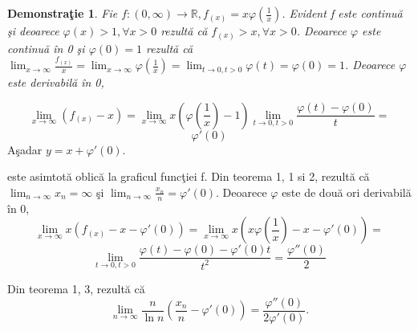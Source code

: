 \documentclass[a4paper,12pt,oneside]{report}
\newtheorem{demonstration}{Demonstra\c tie}
\begin{document}
\begin{demonstration}
  Fie \(f : \left ( 0,\infty  \right ) \to \mathbb{R}, f_{\left ( x \right )}= x\varphi \left ( \frac{1}{x} \right )\). Evident f este continu\u a \c si deoarece \(\varphi \left ( x \right )> 1,\forall x> 0\) rezult\u a c\u a \(f_{\left ( x \right )}> x, \forall x> 0\). Deoarece \(\varphi\) este continu\u a \^ in 0 \c si \(\varphi \left ( 0 \right )= 1\) rezult\u a c\u a \(\lim_{x \to \infty }\frac{f_{\left ( x \right )}}{x} = \lim_{x \to \infty } \varphi \left ( \frac{1}{x} \right ) = \lim_{t \to 0, t> 0 }\varphi \left ( t \right ) = \varphi \left ( 0 \right ) = 1\). Deoarece \(\varphi\) este derivabil\u a \^ in 0, 
\end{demonstration}

\begin{displaymath}
  \lim_{x \to \infty }\left ( f_{\left ( x \right )} -x\right ) = \lim_{x \to \infty } x\left ( \varphi \left ( \frac{1}{x} \right ) -1\right )\lim_{t \to 0, t> 0}\frac{\varphi \left ( t \right ) - \varphi \left ( 0 \right )}{t} = 
\end{displaymath}
\begin{displaymath}
  {\varphi }'\left ( 0 \right )
\end{displaymath}
A\c sadar \(y = x +{\varphi }'\left ( 0 \right )\).
 
este asimtot\u a oblic\u a la graficul func\c tiei f. Din teorema 1, 1 si 2, rezult\u a c\u a \(\lim_{n \to \infty }x_{n} = \infty\) \c si \(\lim_{n \to \infty }\frac{x_{n}}{n} = {\varphi }'\left ( 0 \right )\). Deoarece \(\varphi\) este de dou\u a ori derivabil\u a \^ in 0,
\begin{displaymath}
  \lim_{x \to \infty }x\left ( f_{\left ( x \right ) } -x-{\varphi }'\left ( 0 \right )\right ) = \lim_{x \to \infty }x\left ( x\varphi \left ( \frac{1}{x} \right ) - x - {\varphi }'\left ( 0 \right ) \right ) = \end{displaymath}
\begin{displaymath}
  \lim_{t \to 0, t> 0}\frac{\varphi \left ( t \right ) - \varphi \left ( 0 \right )- {\varphi }'\left ( 0 \right )t}{t^{2}} = \frac{{\varphi }''\left ( 0 \right )}{2}
\end{displaymath}

Din teorema 1, 3, rezult\u a c\u a 
\begin{displaymath}
  \lim_{n \to \infty }\frac{n}{\ln n }\left ( \frac{x_{n}}{n}  - {\varphi }'\left ( 0 \right )\right ) = \frac{{\varphi }''\left ( 0 \right )}{2{\varphi }'\left ( 0 \right )}.
\end{displaymath}
 
\end{document}
